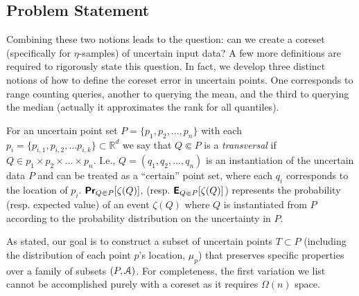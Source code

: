 \documentclass[11pt]{myclass}
\newcommand{\Eu}[1]{\ensuremath{\EuScript{#1}}}
\newcommand{\bl}[1]{\ensuremath{\mathbb{#1}}}
\newcommand{\E}{\textbf{\textsf{E}}}
\renewcommand{\Pr}{\textbf{\textsf{Pr}}}
\begin{document}
\subsection{Problem Statement}
Combining these two notions leads to the question: can we create a coreset (specifically for $\eta$-samples) of uncertain input data?  A few more definitions are required to rigorously state this question.  In fact, we develop three distinct notions of how to define the coreset error in uncertain points.  One corresponds to range counting queries, another to querying the mean, and the third to querying the median (actually it approximates the rank for all quantiles).  

For an uncertain point set $P = \{p_1, p_2, \ldots, p_n\}$ with each $p_i = \{p_{i,1}, p_{i,2}, \ldots p_{i,k}\} \subset \bl{R}^d$ we say that $Q \Subset P$ is a \emph{transversal} if $Q \in p_1 \times p_2 \times \ldots \times p_n$.  I.e., $Q = (q_1, q_2, \ldots, q_n)$ is an instantiation of the uncertain data $P$ and can be treated as a ``certain'' point set, where each $q_i$ corresponds to the location of $p_i$.   
$\Pr_{Q \Subset P} [\zeta(Q)]$, (resp. $\E_{Q \Subset P}[\zeta(Q)]$) represents the probability (resp. expected value) of an event $\zeta(Q)$ where $Q$ is instantiated from $P$ according to the probability distribution on the uncertainty in $P$.  

As stated, our goal is to construct a subset of uncertain points $T \subset P$ (including the distribution of each point $p$'s location, $\mu_p$) that preserves specific properties over a family of subsets $(P,\Eu{A})$.  For completeness, the first variation we list cannot be accomplished purely with a coreset as it requires $\Omega(n)$ space.  
\end{document}
